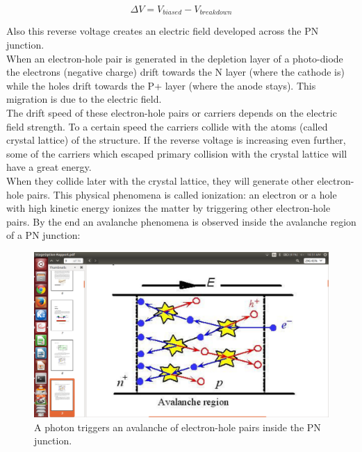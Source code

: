 \documentclass[a4paper, 11pt]{report}%
\begin{document}
  \begin{equation}
    \Delta V = V_{biased} - V_{breakdown}
  \end{equation}

  Also this reverse voltage creates an electric field developed across the PN junction.\\
  When an electron-hole pair is generated in the depletion layer of a photo-diode 
  the electrons (negative charge) drift towards the N layer (where the cathode is) while the holes drift towards the P+ layer 
  (where the anode stays). This migration is due to the electric field. 
  \\
  
  The drift speed of these electron-hole pairs or carriers depends on the electric field strength. To a certain speed
  the carriers collide with the atoms (called crystal lattice) of the structure. If the reverse voltage is increasing even further, 
  some of the carriers which escaped primary collision with the crystal lattice will have a great energy.\\
  When they collide later with the crystal lattice, they will generate other electron-hole pairs. This physical phenomena is called 
  ionization:
  an electron or a hole with high kinetic energy ionizes the matter by triggering other electron-hole pairs. 
  By the end an avalanche phenomena is observed inside the avalanche region of a PN junction:
  
  \begin{figure}[!hbtp] 
  \centering
    \includegraphics[totalheight=.35\textwidth,trim=12.8cm 1.5cm 5.5cm 4cm, clip=true,]{../Pictures/avalanche.png}
    \caption{A photon triggers an avalanche of electron-hole pairs inside the PN junction.}
    \label{fig:avalanche}
  \end{figure}
  
\end{document}
